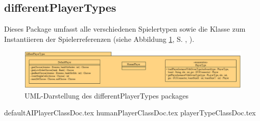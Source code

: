 \subsection{differentPlayerTypes}
\label{ss:differentPlayerTypes}
\FloatBarrier
Dieses Package umfasst alle verschiedenen Spielertypen sowie die Klasse zum Instantiieren der Spielerreferenzen (siehe Abbildung \ref{fig:differentPlayerTypesPackage}, S. \pageref{fig:differentPlayerTypesPackage}, ). 

\begin{figure}
	\centering
	\includegraphics[width=\linewidth]{pics/differentPlayerTypesPackage}
	\caption{UML-Darstellung des differentPlayerTypes packages}
	\label{fig:differentPlayerTypesPackage}
\end{figure}

{defaultAIPlayerClassDoc.tex}
{humanPlayerClassDoc.tex}
{playerTypeClassDoc.tex}